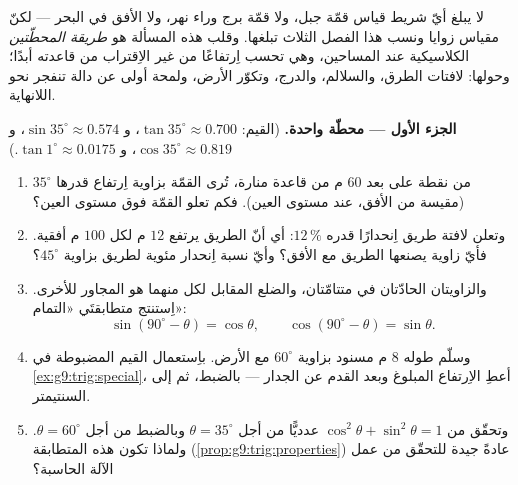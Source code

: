 \begin{problem}
\label{pb:g9:trig:1}
لا يبلغ أيّ شريط قياس قمّة جبل، ولا قمّة برج وراء نهر، ولا
الأفق في البحر --- لكنّ مقياس زوايا ونسب هذا الفصل الثلاث
تبلغها. وقلب هذه المسألة هو \emph{طريقة المحطّتين} الكلاسيكية
عند المساحين، وهي تحسب اِرتفاعًا من غير الاِقتراب من قاعدته
أبدًا؛ وحولها: لافتات الطرق، والسلالم، والدرج، وتكوّر الأرض،
ولمحة أولى عن دالة تنفجر نحو اللانهاية.

\medskip
\noindent\textbf{الجزء الأول --- محطّة واحدة.}
(القيم: $\tan 35^\circ \approx 0.700$،
و $\sin 35^\circ \approx 0.574$، و $\cos 35^\circ \approx 0.819$،
و $\tan 1^\circ \approx 0.0175$.)
\begin{enumerate}
  \item من نقطة على بعد $60$ م من قاعدة منارة، تُرى القمّة
        بزاوية اِرتفاع قدرها $35^\circ$ (مقيسة من الأفق، عند
        مستوى العين). فكم تعلو القمّة فوق مستوى العين؟
  \item وتعلن لافتة طريق اِنحدارًا قدره $12\,\%$: أي أنّ الطريق
        يرتفع $12$ م لكل $100$ م أفقية. فأيّ زاوية يصنعها
        الطريق مع الأفق؟ وأيّ نسبة اِنحدار مئوية لطريق بزاوية
        $45^\circ$؟
  \item والزاويتان الحادّتان في 
        متتامّتان، والضلع المقابل لكل منهما هو المجاور للأخرى.
        اِستنتج متطابقتَي «التمام»:
        \[
        \sin(90^\circ - \theta) = \cos\theta,
        \qquad
        \cos(90^\circ - \theta) = \sin\theta .
        \]
  \item وسلّم طوله $8$ م مسنود بزاوية $60^\circ$ مع الأرض.
        باِستعمال القيم المضبوطة في \cref{ex:g9:trig:special}،
        أعطِ الاِرتفاع المبلوغ وبعد القدم عن الجدار --- بالضبط،
        ثم إلى السنتيمتر.
  \item وتحقّق من $\cos^2\theta + \sin^2\theta = 1$ عدديًّا من
        أجل $\theta = 35^\circ$ وبالضبط من أجل
        $\theta = 60^\circ$. ولماذا تكون هذه المتطابقة
        (\cref{prop:g9:trig:properties}) عادةً جيدة للتحقّق من
        عمل الآلة الحاسبة؟
\end{enumerate}


\end{problem}
